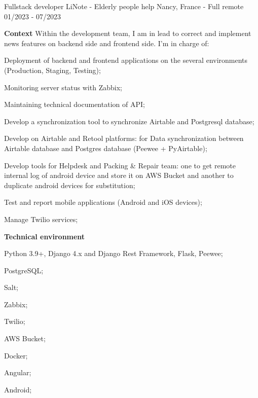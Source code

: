 \begin{cventries}
  \cventry
    {Fullstack developer} %
    {LiNote - Elderly people help} %
    {Nancy, France - Full remote} %
    {01/2023 - 07/2023} %
    {
      \textbf{Context}
      \newline
      Within the development team, I am in lead to correct and implement news features on backend side and frontend side. I'm in charge of:
      \newline \vspace{12pt}
      \begin{cvitems} %
        \item {Deployment of backend and frontend applications on the several environments (Production, Staging, Testing);}
        \item {Monitoring server status with Zabbix;}
        \item {Maintaining technical documentation of API;}
        \item {Develop a synchronization tool to synchronize Airtable and Postgresql database;}
        \item {Develop on Airtable and Retool platforms: for Data synchronization between Airtable database and Postgres database (Peewee + PyAirtable);}
        \item {Develop tools for Helpdesk and Packing \& Repair team: one to get remote internal log of android device and store it on AWS Bucket and another to duplicate android devices for substitution;}
        \item {Test and report mobile applications (Android and iOS devices);}
        \item {Manage Twilio services;}
      \end{cvitems}
      \textbf{Technical environment}
      \newline \vspace{12pt}
      \begin{cvitems}
        \item {Python 3.9+, Django 4.x and Django Rest Framework, Flask, Peewee;}
        \item {PostgreSQL;}
        \item {Salt;}
        \item {Zabbix;}
        \item {Twilio;}
        \item {AWS Bucket;}
        \item {Docker;}
        \item {Angular;}
        \item {Android;}
      \end{cvitems}
    }


\end{cventries}
